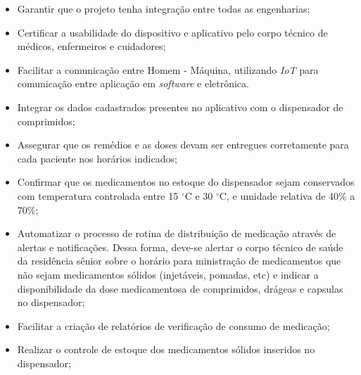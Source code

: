 \begin{itemize}
\item Garantir que o projeto tenha integração entre todas as engenharias;
\item Certificar a usabilidade do dispositivo e aplicativo pelo corpo técnico de médicos, enfermeiros e cuidadores;
\item Facilitar a comunicação entre Homem - Máquina, utilizando \textit{IoT} para comunicação entre aplicação em \textit{software} e eletrônica. 
\item Integrar os dados cadastrados presentes no aplicativo com o dispensador de comprimidos;
\item Assegurar que os remédios e as doses devam ser entregues corretamente para cada paciente nos horários indicados;
\item Confirmar que os medicamentos no estoque do dispensador sejam conservados com temperatura controlada entre 15 $^\circ$C e 30 $^\circ$C, e umidade relativa de 40\% a 70\%;
\item Automatizar o processo de rotina de distribuição de medicação através de alertas e notificações. Dessa forma, deve-se alertar o corpo técnico de saúde da residência sênior sobre o horário para ministração de medicamentos que não sejam medicamentos sólidos (injetáveis, pomadas, etc) e indicar a disponibilidade da dose medicamentosa de comprimidos, drágeas e capsulas no dispensador;
\item Facilitar a criação de relatórios de verificação de consumo de medicação;
\item Realizar o controle de estoque dos medicamentos sólidos inseridos no dispensador;

\end{itemize}







